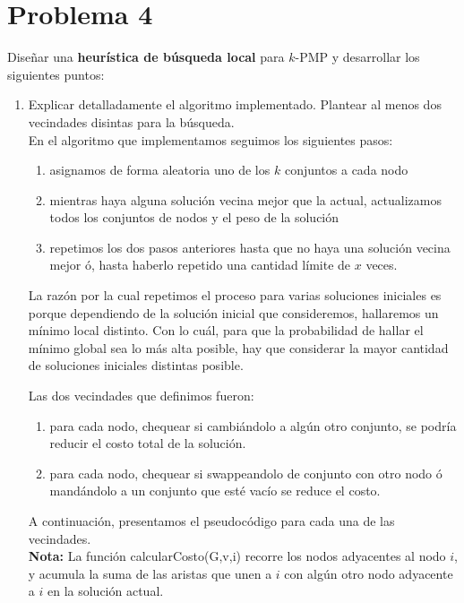 \documentclass[11pt, a4paper, twoside]{article}
\begin{document}


\newpage
\section{Problema 4} 
	
	Diseñar una \textbf{heurística de búsqueda local} para $k$-PMP y desarrollar los siguientes puntos:
    \begin{enumerate}
    
		\item Explicar detalladamente el algoritmo implementado. Plantear al menos dos vecindades disintas
		para la búsqueda. \\
		En el algoritmo que implementamos seguimos los siguientes pasos:
		\begin{enumerate}
			\item asignamos de forma aleatoria uno de los $k$ conjuntos a cada nodo
			\item mientras haya alguna solución vecina mejor que la actual, actualizamos todos los
			      conjuntos de nodos y el peso de la solución
			\item repetimos los dos pasos anteriores hasta que no haya una solución vecina mejor ó, hasta
			      haberlo repetido una cantidad límite de $x$ veces.
		\end{enumerate}
		
		La razón por la cual repetimos el proceso para varias soluciones iniciales es porque dependiendo
		de la solución inicial que consideremos, hallaremos un mínimo local distinto. Con lo cuál, para
		que la probabilidad de hallar el mínimo global sea lo más alta posible, hay que considerar 
		la mayor cantidad de soluciones iniciales distintas posible.
		
		Las dos vecindades que definimos fueron:
		\begin{enumerate}
			\item para cada nodo, chequear si cambiándolo a algún otro conjunto, se podría reducir el costo
			      total de la solución.
			\item para cada nodo, chequear si swappeandolo de conjunto con otro nodo ó mandándolo a un conjunto que esté
			      vacío se reduce el costo.
		\end{enumerate}
		
		A continuación, presentamos el pseudocódigo para cada una de las vecindades. \\
		\textbf{Nota: } La función calcularCosto(G,v,i) recorre los nodos adyacentes al nodo $i$, y acumula la suma
	         		    de las aristas que unen a $i$ con algún otro nodo adyacente a $i$ en la solución actual.
      \begin{algorithm}[H]
			  

\end{algorithm}
\end{enumerate}
\end{document}
